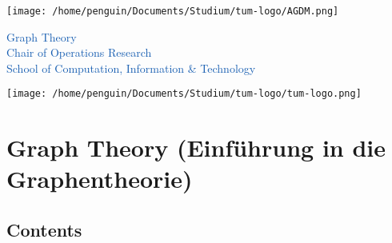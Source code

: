 \documentclass{article}
\begin{document}
\begin{center}
    \begin{minipage}{0.15\textwidth}
        \texttt{[image: /home/penguin/Documents/Studium/tum-logo/AGDM.png]} 
    \end{minipage}
    \hfill
    \begin{minipage}{0.6\textwidth}
        \centering
         \selectfont 
        \textcolor[HTML]{165DB1}{Graph Theory} \\[1ex]
        \textcolor[HTML]{165DB1}{Chair of Operations Research} \\[1ex]
        \textcolor[HTML]{165DB1}{School of Computation, Information \& Technology}
    \end{minipage}
    \hfill
    \begin{minipage}{0.12\textwidth}
        \texttt{[image: /home/penguin/Documents/Studium/tum-logo/tum-logo.png]} 
    \end{minipage}
\end{center}
\noindent
\large 
\vspace{5mm}
\normalsize
\section*{Graph Theory (Einf\"uhrung in die Graphentheorie)}
\subsection*{Contents}
\end{document}
